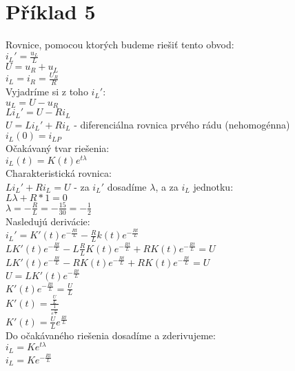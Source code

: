 \section{Příklad 5}
Rovnice, pomocou ktorých budeme riešiť tento obvod: \\
$i_L' = \frac{u_L}{L}$ \\
$U = u_R + u_L$ \\
$i_L = i_R = \frac{U_R}{R}$ \\
\newline
Vyjadríme si z toho $i_L'$: \\
$u_L = U - u_R$ \\
$Li_L' = U - Ri_L$ \\
$U = Li_L' + Ri_L$ - diferenciálna rovnica prvého rádu (nehomogénna) \\
$i_L(0) = i_{LP}$ \\
\newline
Očakávaný tvar riešenia: \\
$i_L(t) = K(t)e^{t\lambda}$ \\
\newline
Charakteristická rovnica: \\
$Li_L' + Ri_L = U$ - za $i_L'$ dosadíme $\lambda$, a za $i_L$ jednotku: \\
$L\lambda + R * 1 = 0$ \\
$\lambda = -\frac{R}{L} = -\frac{15}{30} = -\frac{1}{2}$ \\
\newline
Nasledujú derivácie: \\
$i_L' = K'(t)e^{-\frac{Rt}{L}} - \frac{R}{L}k(t)e^{-\frac{Rt}{L}}$ \\
$LK'(t)e^{-\frac{Rt}{L}} - L\frac{R}{L}K(t)e^{-\frac{Rt}{L}} + RK(t)e^{-\frac{Rt}{L}} = U$ \\
$LK'(t)e^{-\frac{Rt}{L}} - RK(t)e^{-\frac{Rt}{L}} + RK(t)e^{-\frac{Rt}{L}} = U$ \\
$U = LK'(t)e^{-\frac{Rt}{L}}$ \\
$K'(t)e^{-\frac{Rt}{L}} = \frac{U}{L}$ \\
$K'(t) = \frac{\frac{U}{L}}{\frac{1}{e^{\frac{Rt}{L}}}}$ \\
$K'(t) = \frac{U}{L}e^{\frac{Rt}{L}}$ \\
\newline
Do očakávaného riešenia dosadíme a zderivujeme: \\
$i_L = Ke^{t\lambda}$ \\
$i_L = Ke^{-\frac{Rt}{L}}$ \\
